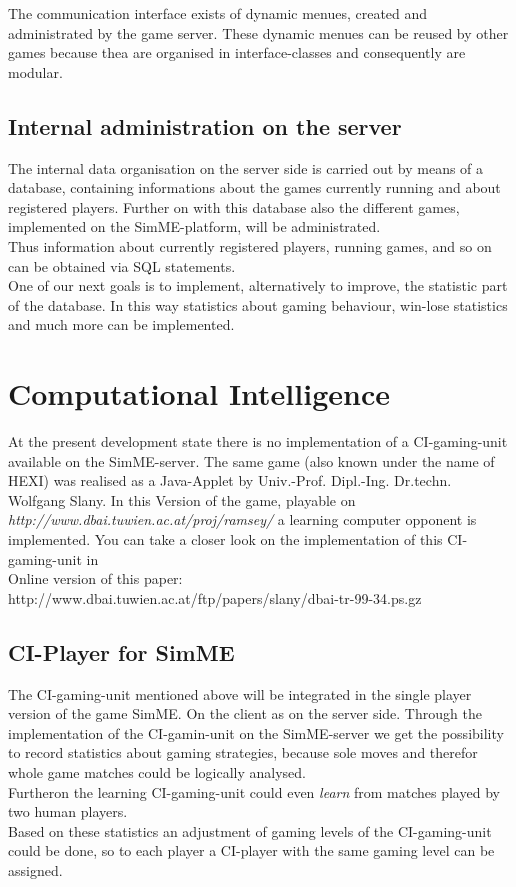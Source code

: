 The communication interface exists of dynamic menues, created and administrated
by the game server. These dynamic menues can be reused by other games because
thea are organised in interface-classes and consequently are modular.

\subsection{Internal administration on the server}
The internal data organisation on the server side is carried out by means of a
database, containing informations about the games currently running and about
registered players. Further on with this database also the different games,
implemented on the SimME-platform, will be administrated.\\
Thus information about currently registered players, running games, and so on
can be obtained via SQL statements. \\
One of our next goals is to implement, alternatively to improve, the statistic
part of the database. In this way statistics about gaming behaviour, win-lose
statistics and much more can be implemented.

\section{Computational Intelligence} \label{CI}
At the present development state there is no implementation of a CI-gaming-unit
available on the SimME-server. The same game (also known under the name of
HEXI) was realised as a Java-Applet by Univ.-Prof. Dipl.-Ing. Dr.techn. Wolfgang
Slany. In this Version of the game, playable on
\textit{http://www.dbai.tuwien.ac.at/proj/ramsey/} a learning computer opponent
is implemented. You can take a closer look on the implementation of this
CI-gaming-unit in \cite{slany_paper}\\
\noindent Online version of this paper:\\
http://www.dbai.tuwien.ac.at/ftp/papers/slany/dbai-tr-99-34.ps.gz

\subsection{CI-Player for SimME}
The CI-gaming-unit mentioned above will be integrated in the single player
version of the game SimME. On the client as on the server side. Through the
implementation of the CI-gamin-unit on the SimME-server we get the possibility
to record statistics about gaming strategies, because sole moves and therefor
whole game matches could be logically analysed. \\
Furtheron the learning CI-gaming-unit could even \textit{learn} from matches
played by two human players.\\
Based on these statistics an adjustment of gaming levels of the CI-gaming-unit
could be done, so to each player a CI-player with the same gaming level can be
assigned.\\



